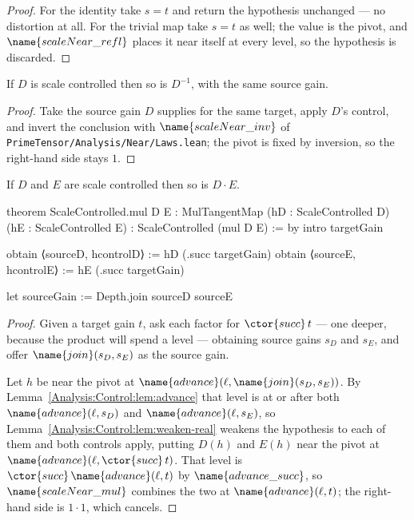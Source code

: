 \begin{proof}
For the identity take $s = t$ and return the hypothesis unchanged --- no
distortion at all.  For the trivial map take $s = t$ as well; the value is the
pivot, and $\name{scaleNear\_refl}$ places it near itself at every level, so
the hypothesis is discarded.
\end{proof}

\begin{theorem}\label{Analysis:Control:thm:inv}
If $D$ is scale controlled then so is $D^{-1}$, with the same source gain.
\end{theorem}

\begin{proof}
Take the source gain $D$ supplies for the same target, apply $D$'s control, and
invert the conclusion with $\name{scaleNear\_inv}$ of
\texttt{PrimeTensor/Analysis/Near/Laws.lean}; the pivot is fixed by inversion,
so the right-hand side stays $1$.
\end{proof}

\begin{theorem}\label{Analysis:Control:thm:mul}
If $D$ and $E$ are scale controlled then so is $D \cdot E$.
\end{theorem}

\begin{leancode}
theorem ScaleControlled.mul {D E : MulTangentMap}
    (hD : ScaleControlled D)
    (hE : ScaleControlled E) :
    ScaleControlled (mul D E) := by
  intro targetGain

  obtain ⟨sourceD, hcontrolD⟩ := hD (.succ targetGain)
  obtain ⟨sourceE, hcontrolE⟩ := hE (.succ targetGain)

  let sourceGain := Depth.join sourceD sourceE
\end{leancode}

\begin{proof}
Given a target gain $t$, ask each factor for $\ctor{succ}\,t$ --- one deeper,
because the product will spend a level --- obtaining source gains $s_D$ and
$s_E$, and offer $\name{join}(s_D, s_E)$ as the source gain.

Let $h$ be near the pivot at $\name{advance}(\ell, \name{join}(s_D,s_E))$.  By
Lemma~\ref{Analysis:Control:lem:advance} that level is at or after both
$\name{advance}(\ell,s_D)$ and $\name{advance}(\ell,s_E)$, so
Lemma~\ref{Analysis:Control:lem:weaken-real} weakens the hypothesis to each of
them and both controls apply, putting $D(h)$ and $E(h)$ near the pivot at
$\name{advance}(\ell, \ctor{succ}\,t)$.  That level is
$\ctor{succ}\,\name{advance}(\ell,t)$ by $\name{advance\_succ}$, so
$\name{scaleNear\_mul}$ combines the two at $\name{advance}(\ell,t)$; the
right-hand side is $1 \cdot 1$, which cancels.
\end{proof}

